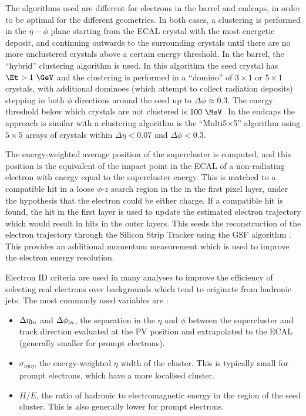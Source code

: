The algorithms used are different for electrons in the barrel and endcaps, in
order to be optimal for the different geometries. In both cases, a clustering is performed
in the $\eta-\phi$ plane starting from the \ac{ECAL} crystal with the most energetic deposit, and
continuing outwards to the surrounding crystals until there are no more
unclustered crystals above a certain energy threshold. In the barrel, the
``hybrid'' clustering algorithm is used. In this algorithm the seed crystal has
$\Et > 1~\GeV$ and the clustering is performed in a ``domino'' of $3\times1$ or
$5\times1$ crystals, with additional dominoes (which attempt to collect
radiation deposits) stepping in both $\phi$
directions around the seed up to $\Delta\phi\approx0.3$. The energy threshold
below which crystals are not clustered  is $100~\MeV$. In the endcaps the
approach is similar with a clustering algorithm
is the ``Multi5$\times$5'' algorithm using $5\times5$ arrays of crystals within
$\Delta\eta<0.07$ and $\Delta\phi<0.3$.

The energy-weighted average position of the supercluster is computed, and this
position is the equivalent of the impact point in the \ac{ECAL} of a
non-radiating electron with energy equal to the supercluster energy. This is
matched to a compatible hit in a loose $\phi$-$z$ search region 
in the in the first pixel layer, under the
hypothesis that the electron could be either charge. If a compatible hit is
found, the hit in the first layer is used to update the estimated electron
trajectory which would result in hits in the outer layers. This seeds the
reconstruction of the electron trajectory through the Silicon Strip Tracker
using the \ac{GSF} algorithm \cite{GSFalgorithm}. This provides an additional momentum measurement
which is used to improve the electron energy resolution. 

Electron ID criteria are used in many analyses to improve the efficiency of
selecting real electrons over backgrounds which tend to originate from
hadronic jets. The most commonly used variables are \cite{Baffioni:2006cd}:

\begin{itemize}
\item $\Delta\eta_{\text in}$ and $\Delta\phi_{\text in}$, the separation in the
$\eta$ and $\phi$ between the supercluster and track direction
evaluated at the \ac{PV} position and extrapolated to the \ac{ECAL} (generally
smaller for prompt electrons).
\item $\sigma_{i\eta i\eta}$, the energy-weighted $\eta$ width of the cluster.
This is typically small for prompt electrons, which have a more localised
cluster.
\item $H/E$, the ratio of hadronic to electromagnetic energy in the region of
the seed cluster. This is also generally lower for prompt electrons.
\end{itemize}

